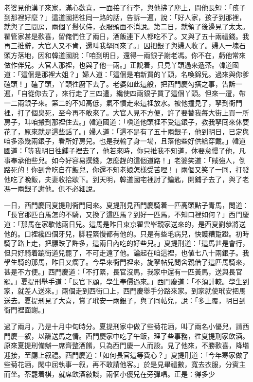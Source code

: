老婆見他漢子來家，滿心歡喜，一面接了行李，與他拂了塵上，問他長短：「孩子到那裡好麼？」這道國把徃囘一路的話，告訴一遍，說：「好人家，孩子到那裡，就與了三間房，兩個丫鬟伏侍，衣服頭面不消說。第二日，就領了後邊見了太太。翟管家甚是歡喜，留俺們住了兩日，酒飯連下人都吃不了。又與了五十兩禮錢。我再三推辭，大官人又不肯，還叫我拏囘來了。」因把銀子與婦人收了。婦人一塊石頭方落地，因和韓道國說：「咱到明日，還得一兩銀子謝老馮。你不在，虧他常來做作伴兒。大官人那裡，也與了他一兩。」正說着，只見丫頭過來遞茶。韓道國道：「這個是那裡大姐？」婦人道：「這個是咱新買的丫頭，名喚錦兒。過來與你爹磕頭！」磕了頭，丫頭徃廚下去了。老婆如此這般，把西門慶勾搭之事，告訴一遍，「自從你去了，來行走了三四遭，纔使四兩銀子買了這個丫頭。但來一遭，帶一二兩銀子來。第二的不知高低，氣不憤走來這裡放水。被他撞見了，拏到衙門裡，打了個臭死，至今再不敢來了。大官人見不方便，許了要替我每大街上買一所房子，叫咱搬到那裡住去。」韓道國道：「嗔道他頭裡不受這銀子，教我拏囘來休要花了，原來就是這些話了。」婦人道：「這不是有了五十兩銀子，他到明日，已定與咱多添幾兩銀子，看所好房兒。也是我輸了身一場，且落他些好供給穿戴。」韓道國道：「等我明日徃鋪子裡去了，他若來時，你只推我不知道，休要怠慢了他，凡事奉承他些兒。如今好容易撰錢，怎麼趕的這個道路！」{}老婆笑道：「賊強人，倒路死的！你到會吃自在飯兒，你還不知老娘怎樣受苦哩！」兩個又笑了一囘，打發他吃了晚飯，夫妻收拾歇下。到天明，韓道國宅裡討了鑰匙，開鋪子去了，與了老馮一兩銀子謝他。俱不必細說。

一日，西門慶同夏提刑衙門囘來。夏提刑見西門慶騎着一匹高頭點子青馬，問道：「長官那匹白馬怎的不騎，又換了這匹馬？到好一匹馬，不知口裡如何？」西門慶道：「那馬在家歇他兩日兒。這馬是昨日東京翟雲峯親家送來的，{}是西夏劉叅將送他的。口裡纔四個牙兒，脚程緊慢都有他的。只是有些毛病兒，快護糟踅蹬。初時騎了路上走，把膘跌了許多，這兩日內吃的好些兒。」夏提刑道：「這馬甚是會行，但只好騎着蹗街道兒罷了，不可走遠了他。論起在咱這裡，也値七八十兩銀子。我學生騎的那馬，昨日又瘸了。今早來衙門裡來，旋拏帖兒問舍親借了這匹馬騎來，甚是不方便。」西門慶道：「不打緊，長官沒馬，我家中還有一匹黃馬，送與長官罷。」夏提刑舉手道：「長官下顧，學生奉價過來。」西門慶道：「不須計較。學生到家，就差人送來。」兩個走到西街口上，西門慶舉手分路來家。到家就使玳安把馬送去。夏提刑見了大喜，賞了玳安一兩銀子，與了囘帖兒，說：「多上覆，明日到衙門裡面謝。」

過了兩月，乃是十月中旬時分。夏提刑家中做了些菊花酒，叫了兩名小優兒，請西門慶一叙，以酬送馬之情。西門慶家中吃了午飯，理了些事務，徃夏提刑家飲酒。原來夏提刑備辦一席齊整酒餚，只為西門慶一人而設。見了他來，不勝歡喜，降堦迎接，至廳上叙禮。西門慶道：「如何長官這等費心？」夏提刑道：「今年寒家做了些菊花酒，閑中屈執事一叙，再不敢請他客。」於是見畢禮數，寬去衣服，分賓主而坐。茶罷着棋，就席飲酒敍談，兩個小優兒在旁彈唱。正是：得多少

